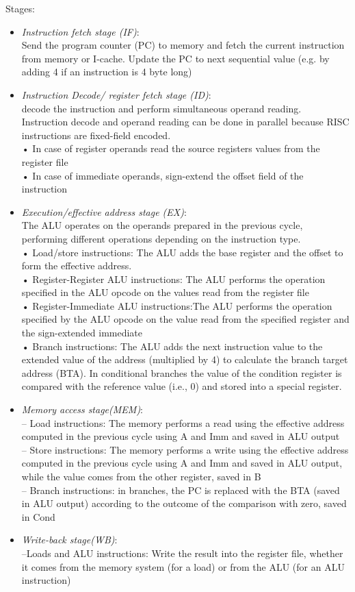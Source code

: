 Stages:
 \begin{itemize}
    \item \textit{Instruction fetch stage (IF)}:\\ Send the program counter (PC) to memory and fetch the current instruction from memory or I-cache. Update the PC to next sequential value (e.g. by adding 4 if an instruction is 4 byte long)
    \item \textit{Instruction Decode/ register fetch stage (ID)}:\\decode the instruction and perform simultaneous operand reading. Instruction decode and operand reading can be done in parallel because RISC instructions are fixed-field encoded. \\
    • In case of register operands read the source registers values from the register file\\
    • In case of immediate operands, sign-extend the offset field of the instruction
    \item \textit{Execution/effective address stage (EX)}:\\
    The ALU operates on the operands prepared in the previous cycle, performing different operations depending on the instruction type.\\
    • Load/store instructions: The ALU adds the base register and the offset to form the effective address. \\
    • Register-Register ALU instructions: The ALU performs the operation specified in the ALU opcode on the values read from the register file \\
    • Register-Immediate ALU instructions:The ALU performs the operation specified by the ALU opcode on the value read from the specified register and the sign-extended immediate \\
    • Branch instructions: The ALU adds the next instruction value to the extended value of the address (multiplied by 4) to calculate the branch target address (BTA).
    In conditional branches the value of the condition register is compared with the reference value (i.e., 0) and stored into a special register.
    \item \textit{Memory access stage(MEM)}:\\
    – Load instructions: The memory performs a read using the effective address computed in the previous cycle using A and Imm and saved in ALU output\\
    – Store instructions: The memory performs a write using the effective address computed in the previous cycle using A and Imm and saved in ALU output, while the value comes from the other register, saved in B\\
    – Branch instructions: in branches, the PC is replaced with the BTA (saved in ALU output) according to the outcome of the comparison with zero, saved in Cond
    \item \textit{Write-back stage(WB)}:\\
    –Loads and ALU instructions: Write the result into the register file, whether it comes from the memory system (for a load) or from the ALU (for an ALU instruction)
\end{itemize}

